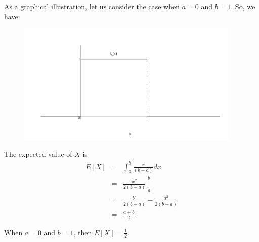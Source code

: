 \documentclass[notes=show,smaller,handout]{beamer}\usepackage[]{graphicx}\usepackage[]{color}
\begin{document}
\begin{frame}{\subsecname}


As a graphical illustration, let us consider the case when $a=0$ and $b=1$. So, we have:%
\begin{figure}[ptb]\centering
\includegraphics[width=0.95\textwidth,height=0.75\textheight]{img/uniform_pdf3.pdf}%
\end{figure}%


\end{frame}%



\begin{frame}{\secname}
  The expected value of $X$ is%
  \begin{eqnarray*}
  E\left[ X\right] &=&\int_{a}^{b}\frac{x}{\left( b-a\right) }dx \\
  &=&\left. \frac{x^{2}}{2\left( b-a\right) }\right\vert _{a}^{b} \\
  &=&\frac{b^{2}}{2\left( b-a\right) }-\frac{a^{2}}{2\left( b-a\right) } \\
  &=&\frac{a+b}{2}
  \end{eqnarray*}

  \begin{example}
  When $a=0$ and $b=1$, then $E\left[ X\right] =\frac{1}{2}$.
  \end{example}
\end{frame}
\end{document}
